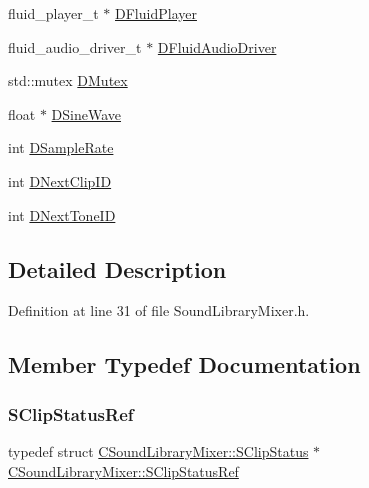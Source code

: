 \begin{DoxyCompactItemize}
\item 
fluid\+\_\+player\+\_\+t $\ast$ \hyperlink{classCSoundLibraryMixer_a6773ddf83ef86bc27598f6c5cee61d9c}{D\+Fluid\+Player}
\item 
fluid\+\_\+audio\+\_\+driver\+\_\+t $\ast$ \hyperlink{classCSoundLibraryMixer_a4ba4ccc9c6603c98a5432042e779977e}{D\+Fluid\+Audio\+Driver}
\item 
std\+::mutex \hyperlink{classCSoundLibraryMixer_a955562a0638df831413a1c6b8860f9fb}{D\+Mutex}
\item 
float $\ast$ \hyperlink{classCSoundLibraryMixer_a7d696c93362c862bfc651a28ee8f67cf}{D\+Sine\+Wave}
\item 
int \hyperlink{classCSoundLibraryMixer_af2d94eb0c2b55d92ff00d18a25cbed6a}{D\+Sample\+Rate}
\item 
int \hyperlink{classCSoundLibraryMixer_a9bbd8e4d0945a06cdb3b21aa05ddeb60}{D\+Next\+Clip\+ID}
\item 
int \hyperlink{classCSoundLibraryMixer_a88efc1ea710744bceadccf66967f9736}{D\+Next\+Tone\+ID}
\end{DoxyCompactItemize}


\subsection{Detailed Description}


Definition at line 31 of file Sound\+Library\+Mixer.\+h.



\subsection{Member Typedef Documentation}
\hypertarget{classCSoundLibraryMixer_a2f004304483c7a121cb477d218b9226f}{}\label{classCSoundLibraryMixer_a2f004304483c7a121cb477d218b9226f} 
\subsubsection{\texorpdfstring{S\+Clip\+Status\+Ref}{SClipStatusRef}}
{\footnotesize\ttfamily typedef  struct \hyperlink{structCSoundLibraryMixer_1_1SClipStatus}{C\+Sound\+Library\+Mixer\+::\+S\+Clip\+Status} $\ast$ \hyperlink{classCSoundLibraryMixer_a2f004304483c7a121cb477d218b9226f}{C\+Sound\+Library\+Mixer\+::\+S\+Clip\+Status\+Ref}\hspace{0.3cm}{\ttfamily [protected]}}

